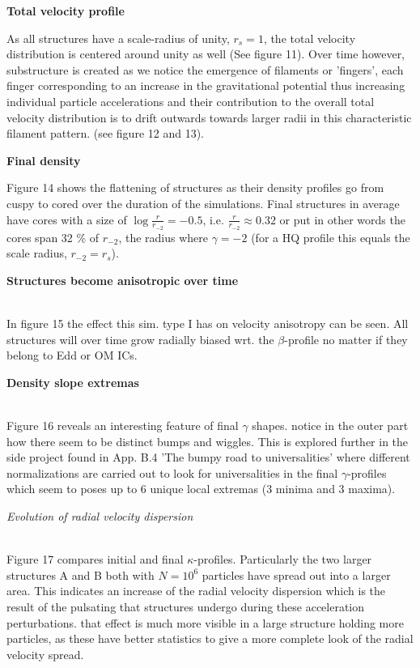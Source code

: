 \centerline{\textbf{Total velocity profile}} 
As all structures have a scale-radius of unity, $r_s = 1$, the total velocity distribution is centered around unity as well (See figure 11). Over time however, substructure is created as we notice the emergence of filaments or 'fingers', each finger corresponding to an increase in the gravitational potential thus increasing individual particle accelerations and their contribution to the overall total velocity distribution is to drift outwards towards larger radii in this characteristic filament pattern. (see figure 12 and 13). 

\centerline{\textbf{Final density}} 
Figure 14 shows the flattening of structures as their density profiles go from cuspy to cored over the duration of the simulations. Final structures in average have cores with a size of $\log \frac{r}{r_{-2}} = -0.5$, i.e. $\frac{r}{r_{-2}} \approx 0.32$ or put in other words the cores span 32 \% of $r_{-2}$, the radius where $\gamma = -2$ (for a HQ profile this equals the scale radius, $r_{-2} = r_s$). \\
\centerline{\textbf{Structures become anisotropic over time}} \\
In figure 15 the effect this sim. type I has on velocity anisotropy can be seen. All structures will over time grow radially biased wrt. the $\beta$-profile no matter if they belong to Edd or OM ICs. \\
\centerline{\textbf{Density slope extremas}} \\
Figure 16 reveals an interesting feature of final $\gamma$ shapes. notice in the outer part how there seem to be distinct bumps and wiggles. This is explored further in the side project found in App. B.4 'The bumpy road to universalities' where different normalizations are carried out to look for universalities in the final $\gamma$-profiles which seem to poses up to 6 unique local extremas (3 minima and 3 maxima). \\
\centerline{\textit{Evolution of radial velocity dispersion}} \\
Figure 17 compares initial and final $\kappa$-profiles. Particularly the two larger structures A and B both with $N = 10^6$ particles have spread out into a larger area. This indicates an increase of the radial velocity dispersion which is the result of the pulsating  that structures undergo during these acceleration perturbations. that effect is much more visible in a large structure holding more particles, as these have better statistics to give a more complete look of the radial velocity spread. 

